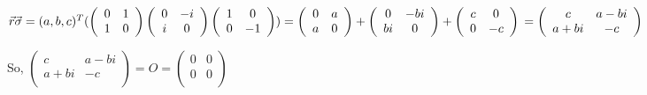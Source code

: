 \documentclass{article}
\begin{document}
\begin{enumerate}
          $\vec{r}\vec{\sigma}
              \\=(a,b,c)^T(\left(
              \begin{array}{cc}
                      0 & 1 \\1&0\\
                  \end{array}
              \right)\left(
              \begin{array}{cc}
                      0 & -i \\i&0\\
                  \end{array}
              \right)\left(
              \begin{array}{cc}
                      1 & 0 \\0&-1\\
                  \end{array}
              \right))
              \\=\left(
              \begin{array}{cc}
                      0 & a \\a&0\\
                  \end{array}
              \right)+\left(
              \begin{array}{cc}
                      0 & -bi \\bi&0\\
                  \end{array}
              \right)+\left(
              \begin{array}{cc}
                      c & 0 \\0&-c\\
                  \end{array}
              \right)
              \\=\left(
              \begin{array}{cc}
                      c & a-bi \\a+bi&-c\\
                  \end{array}
              \right)
          $

          So, $\left(
              \begin{array}{cc}
                      c & a-bi \\a+bi&-c\\
                  \end{array}
              \right)=O=\left(
              \begin{array}{cc}
                      0 & 0 \\0&0\\
                  \end{array}
              \right)$


\end{enumerate}
\end{document}
